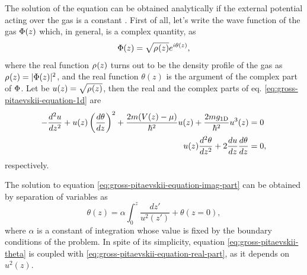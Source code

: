 The solution of the {\GP} equation can be obtained analytically if the external potential acting
over the gas is a constant \cite{bib:zakharov-sov-phys-jetp.34.1972, bib:smerzi-phys-rev-E.70.016605.2004,
bib:seaman-phys-rev-A.71.033622.2005}. First of all, let's write the wave function of the gas ${\Phi}(z)$
which, in general, is a complex quantity, as
%
\begin{equation}
	\label{eq:gross-pitaevskii-wave-function}
	{\Phi}(z) = \sqrt{{\rho_{}}(z)} e^{i \theta(z)},
\end{equation}
%
where the real function ${\rho_{}}(z)$ turns out to be the density profile of the gas as
${\rho_{}}(z) = |{\Phi}(z)|^2$, and the real function $\theta(z)$ is the argument of the complex
part of ${\Phi}$. Let be $u(z) = \sqrt{{\rho_{}}(z)}$, then the real and the complex parts of eq.
\eqref{eq:gross-pitaevskii-equation-1d} are
%
\begin{align}
	\label{eq:gross-pitaevskii-equation-real-part} -\frac{d^2 u}{dz^2} + u(z) \left(\frac{d\theta}{dz}\right)^2 + \frac{2m (V(z) - \mu)}{\hbar^2} u(z) + \frac{2 m g_{ \mathrm{1D} }}{\hbar^2} u^3(z) &= 0 \\
	\label{eq:gross-pitaevskii-equation-imag-part} u(z) \frac{d^2 \theta}{dz^2}  + 2\frac{du}{dz} \frac{d \theta}{dz} &= 0,
\end{align}
%
respectively.

The solution to equation \eqref{eq:gross-pitaevskii-equation-imag-part} can be obtained by separation of variables
as
%
\begin{equation}
	\label{eq:gross-pitaevskii-theta}
	\theta(z) = \alpha \int_{0}^{z} \frac{dz'}{u^2(z')} + \theta(z=0),
\end{equation}
%
where $\alpha$ is a constant of integration whose value is fixed by the boundary conditions of the
problem. In spite of its simplicity, equation \eqref{eq:gross-pitaevskii-theta} is coupled with \eqref{eq:gross-pitaevskii-equation-real-part}, as it depends on $u^2(z)$.

